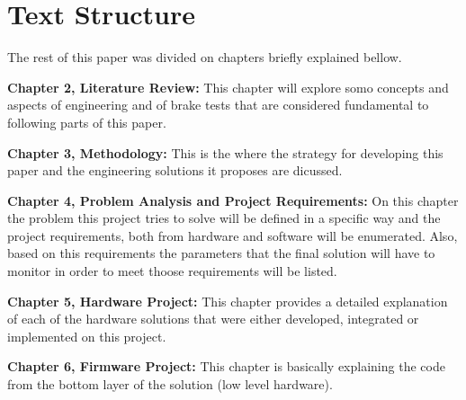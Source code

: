 	\section{Text Structure}\label{sec:text-structure}
	
	The rest of this paper was divided on chapters briefly explained bellow.
	
	\textbf{Chapter 2, Literature Review: } This chapter will explore somo concepts and aspects of engineering and of brake tests that are considered fundamental to following parts of this paper.
	\par
	
	\textbf{Chapter 3, Methodology: }
	This is the where the strategy for developing this paper and the engineering solutions it proposes are dicussed.
	\par
	
	\textbf{Chapter 4, Problem Analysis and Project Requirements: }
	On this chapter the problem this project tries to solve will be defined in a specific way and the project requirements, both from hardware and software will be enumerated. Also, based on this requirements the parameters that the final solution will have to monitor in order to meet thoose requirements will be listed.
	\par
	
	\textbf{Chapter 5, Hardware Project: }
	This chapter provides a detailed explanation of each of the hardware solutions that were either developed, integrated or implemented on this project.
	\par
	
	\textbf{Chapter 6, Firmware Project: }
	This chapter is basically explaining the code from the bottom layer of the solution (low level hardware).
